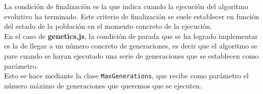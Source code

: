 La condición de finalización es la que indica cuando la ejecución del algoritmo evolutivo ha terminado. Este criterio de finalización se suele establecer en función del estado de la población en el momento concreto de la ejecución. \\

En el caso de \textbf{genetics.js}, la condición de parada que se ha logrado implementar es la de llegar a un número concreto de generaciones, es decir que el algoritmo se pare cuando se hayan ejecutado una serie de generaciones que se establecen como parámetro. \\

Esto se hace mediante la clase \texttt{MaxGenerations}, que recibe como parámetro el número máximo de generaciones que queremos que se ejecuten.